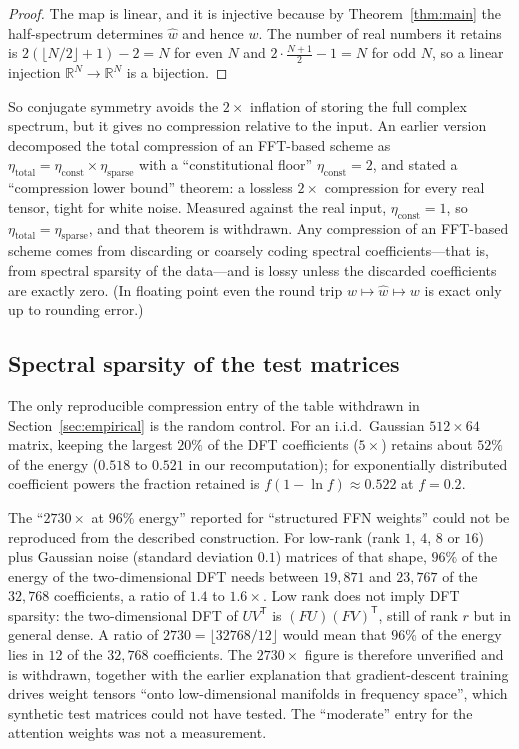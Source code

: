 \documentclass[12pt]{article}
\theoremstyle{definition}
\newcommand{\R}{\mathbb{R}}
\begin{document}
\begin{proof}
The map is linear, and it is injective because by
Theorem~\ref{thm:main} the half-spectrum determines $\hat{w}$ and hence
$w$.  The number of real numbers it retains is
$2(\lfloor N/2 \rfloor + 1) - 2 = N$ for even $N$ and
$2 \cdot \tfrac{N+1}{2} - 1 = N$ for odd $N$, so a linear injection
$\R^N \to \R^N$ is a bijection.
\end{proof}

So conjugate symmetry avoids the $2\times$ inflation of storing the full
complex spectrum, but it gives no compression relative to the input.
An earlier version decomposed the total compression of an FFT-based
scheme as $\eta_{\mathrm{total}} = \eta_{\mathrm{const}} \times
\eta_{\mathrm{sparse}}$ with a ``constitutional floor''
$\eta_{\mathrm{const}} = 2$, and stated a ``compression lower bound''
theorem: a lossless $2\times$ compression for every real tensor, tight
for white noise.  Measured against the real input, $\eta_{\mathrm{const}}
= 1$, so $\eta_{\mathrm{total}} = \eta_{\mathrm{sparse}}$, and that
theorem is withdrawn.  Any compression of an FFT-based scheme comes from
discarding or coarsely coding spectral coefficients---that is, from
spectral sparsity of the data---and is lossy unless the discarded
coefficients are exactly zero.  (In floating point even the round trip
$w \mapsto \hat{w} \mapsto w$ is exact only up to rounding error.)

\subsection{Spectral sparsity of the test matrices}

The only reproducible compression entry of the table withdrawn in
Section~\ref{sec:empirical} is the random control.  For an i.i.d.\
Gaussian $512 \times 64$ matrix, keeping the largest $20\%$ of the DFT
coefficients ($5\times$) retains about $52\%$ of the energy ($0.518$ to
$0.521$ in our recomputation); for exponentially distributed coefficient
powers the fraction retained is $f(1 - \ln f) \approx 0.522$ at $f = 0.2$.

The ``$2730\times$ at $96\%$ energy'' reported for ``structured FFN
weights'' could not be reproduced from the described construction.  For
low-rank (rank $1$, $4$, $8$ or $16$) plus Gaussian noise (standard
deviation $0.1$) matrices of that shape, $96\%$ of the energy of the
two-dimensional DFT needs between $19{,}871$ and $23{,}767$ of the
$32{,}768$ coefficients, a ratio of $1.4$ to $1.6\times$.  Low rank does
not imply DFT sparsity: the two-dimensional DFT of $UV^{\mathsf{T}}$ is
$(FU)(FV)^{\mathsf{T}}$, still of rank $r$ but in general dense.  A ratio
of $2730 = \lfloor 32768/12 \rfloor$ would mean that $96\%$ of the energy
lies in $12$ of the $32{,}768$ coefficients.  The $2730\times$ figure is
therefore unverified and is withdrawn, together with the earlier
explanation that gradient-descent training drives weight tensors ``onto
low-dimensional manifolds in frequency space'', which synthetic test
matrices could not have tested.  The ``moderate'' entry for the
attention weights was not a measurement.
\end{document}
